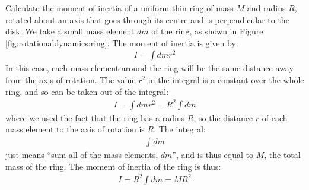 \begin{example}{Calculate the moment of inertia of a uniform thin ring of mass $M$ and radius $R$, rotated about an axis that goes through its centre and is perpendicular to the disk.}
We take a small mass element $dm$ of the ring, as shown in Figure \ref{fig:rotationaldynamics:ring}. 
The moment of inertia is given by:
\begin{align*}
I = \int dm r^2
\end{align*}
In this case, each mass element around the ring will be the same distance away from the axis of rotation. The value $r^2$ in the integral is a constant over the whole ring, and so can be taken out of the integral:
\begin{align*}
I = \int dm r^2 = R^2\int dm
\end{align*}
where we used the fact that the ring has a radius $R$, so the distance $r$ of each mass element to the axis of rotation is $R$. The integral:
\begin{align*}
\int dm
\end{align*}
just means ``sum all of the mass elements, $dm$'', and is thus equal to $M$, the total mass of the ring. The moment of inertia of the ring is thus:
\begin{align*}
I = R^2\int dm = MR^2
\end{align*}
\end{example}

